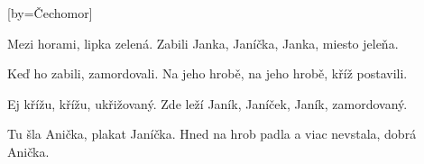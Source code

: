 [by={Čechomor}]

\beginverse{}
\lrep{} Mezi horami, lipka zelená. \rrep{}
\lrep{} Zabili Janka, Janíčka, Janka, miesto jeleňa. \rrep{}
\endverse{}

\beginverse{}
\chordsoff{}
\lrep{} Keď ho zabili, zamordovali. \rrep{}
\lrep{} Na jeho hrobě, na jeho hrobě, kříž postavili. \rrep{}
\chordson{}
\endverse{}

\beginverse{}
\chordsoff{}
\lrep{} Ej křížu, křížu, ukřižovaný. \rrep{}
\lrep{} Zde leží Janík, Janíček, Janík, zamordovaný. \rrep{}
\chordson{}
\endverse{}

\beginverse{}
\chordsoff{}
\lrep{} Tu šla Anička, plakat Janíčka. \rrep{}
\lrep{} Hned na hrob padla a viac nevstala, dobrá Anička. \rrep{}
\chordson{}
\endverse{}

\endsong{}
